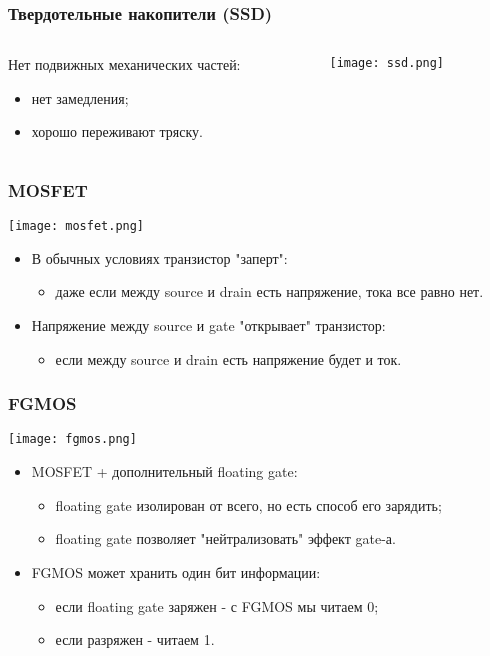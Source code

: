 \begin{frame}
\frametitle{Твердотельные накопители (SSD)}
\begin{columns}
  \begin{column}{.5\linewidth}
    Нет подвижных механических частей:
    \begin{itemize}
      \item нет замедления;
      \item хорошо переживают тряску. 
    \end{itemize}
  \end{column}
  \begin{column}{.5\linewidth}
    \texttt{[image: ssd.png]}
  \end{column}
\end{columns}
\end{frame}

\begin{frame}
\frametitle{MOSFET}
\begin{center}
  \texttt{[image: mosfet.png]}
\end{center}
\begin{itemize}
  \item В обычных условиях транзистор "заперт":
  \begin{itemize}
    \item даже если между source и drain есть напряжение, тока все равно нет.
  \end{itemize}
  \item Напряжение между source и gate "открывает" транзистор:
  \begin{itemize}
    \item если между source и drain есть напряжение будет и ток.
  \end{itemize}
\end{itemize}
\end{frame}

\begin{frame}
\frametitle{FGMOS}
\begin{center}
  \texttt{[image: fgmos.png]}
\end{center}
\begin{itemize}
  \item MOSFET + дополнительный floating gate:
  \begin{itemize}
    \item floating gate изолирован от всего, но есть способ его зарядить;
    \item floating gate позволяет "нейтрализовать" эффект gate-а.
  \end{itemize}
  \item FGMOS может хранить один бит информации:
  \begin{itemize}
    \item если floating gate заряжен - с FGMOS мы читаем 0;
    \item если разряжен - читаем 1.
  \end{itemize}
\end{itemize}
\end{frame}

